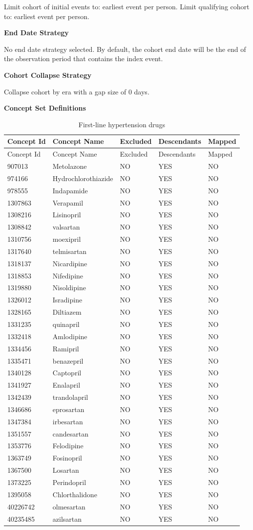 \documentclass[11pt]{book}
\theoremstyle{definition}
\theoremstyle{definition}
\theoremstyle{definition}
\theoremstyle{remark}
\begin{document}
Limit cohort of initial events to: earliest event per person.
Limit qualifying cohort to: earliest event per person.

\textbf{End Date Strategy}

No end date strategy selected. By default, the cohort end date will be the end of the observation period that contains the index event.

\textbf{Cohort Collapse Strategy}

Collapse cohort by era with a gap size of 0 days.

\textbf{Concept Set Definitions}

\begin{longtable}[]{@{}lllll@{}}
\caption{\label{tab:HTN1yrFO1stLine} First-line hypertension drugs}\tabularnewline
\toprule
Concept Id & Concept Name & Excluded & Descendants & Mapped\tabularnewline
\midrule
\endfirsthead
\toprule
Concept Id & Concept Name & Excluded & Descendants & Mapped\tabularnewline
\midrule
\endhead
907013 & Metolazone & NO & YES & NO\tabularnewline
974166 & Hydrochlorothiazide & NO & YES & NO\tabularnewline
978555 & Indapamide & NO & YES & NO\tabularnewline
1307863 & Verapamil & NO & YES & NO\tabularnewline
1308216 & Lisinopril & NO & YES & NO\tabularnewline
1308842 & valsartan & NO & YES & NO\tabularnewline
1310756 & moexipril & NO & YES & NO\tabularnewline
1317640 & telmisartan & NO & YES & NO\tabularnewline
1318137 & Nicardipine & NO & YES & NO\tabularnewline
1318853 & Nifedipine & NO & YES & NO\tabularnewline
1319880 & Nisoldipine & NO & YES & NO\tabularnewline
1326012 & Isradipine & NO & YES & NO\tabularnewline
1328165 & Diltiazem & NO & YES & NO\tabularnewline
1331235 & quinapril & NO & YES & NO\tabularnewline
1332418 & Amlodipine & NO & YES & NO\tabularnewline
1334456 & Ramipril & NO & YES & NO\tabularnewline
1335471 & benazepril & NO & YES & NO\tabularnewline
1340128 & Captopril & NO & YES & NO\tabularnewline
1341927 & Enalapril & NO & YES & NO\tabularnewline
1342439 & trandolapril & NO & YES & NO\tabularnewline
1346686 & eprosartan & NO & YES & NO\tabularnewline
1347384 & irbesartan & NO & YES & NO\tabularnewline
1351557 & candesartan & NO & YES & NO\tabularnewline
1353776 & Felodipine & NO & YES & NO\tabularnewline
1363749 & Fosinopril & NO & YES & NO\tabularnewline
1367500 & Losartan & NO & YES & NO\tabularnewline
1373225 & Perindopril & NO & YES & NO\tabularnewline
1395058 & Chlorthalidone & NO & YES & NO\tabularnewline
40226742 & olmesartan & NO & YES & NO\tabularnewline
40235485 & azilsartan & NO & YES & NO\tabularnewline
\bottomrule
\end{longtable}
\end{document}
